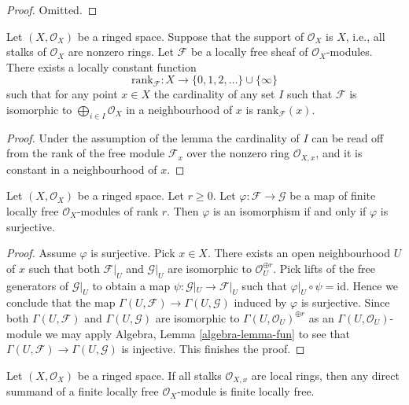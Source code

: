 \begin{proof}
Omitted.
\end{proof}

\begin{lemma}
\label{lemma-rank}
Let $(X, \mathcal{O}_X)$ be a ringed space.
Suppose that the support of $\mathcal{O}_X$ is $X$,
i.e., all stalks of $\mathcal{O}_X$ are nonzero rings.
Let $\mathcal{F}$ be a locally free sheaf of $\mathcal{O}_X$-modules.
There exists a locally constant function
$$
\text{rank}_\mathcal{F} :
X \longrightarrow \{0, 1, 2, \ldots\}\cup\{\infty\}
$$
such that for any point $x \in X$ the cardinality of any
set $I$ such that $\mathcal{F}$ is isomorphic to
$\bigoplus_{i\in I} \mathcal{O}_X$ in a neighbourhood
of $x$ is $\text{rank}_\mathcal{F}(x)$.
\end{lemma}

\begin{proof}
Under the assumption of the lemma the cardinality of $I$ can be read off
from the rank of the free module $\mathcal{F}_x$ over the nonzero ring
$\mathcal{O}_{X, x}$, and it is constant in a neighbourhood of $x$.
\end{proof}

\begin{lemma}
\label{lemma-map-finite-locally-free}
Let $(X, \mathcal{O}_X)$ be a ringed space. Let $r \geq 0$.
Let $\varphi : \mathcal{F} \to \mathcal{G}$ be a map of finite
locally free $\mathcal{O}_X$-modules of rank $r$.
Then $\varphi$ is an isomorphism if and only if $\varphi$
is surjective.
\end{lemma}

\begin{proof}
Assume $\varphi$ is surjective. Pick $x \in X$.
There exists an open neighbourhood $U$ of $x$
such that both $\mathcal{F}|_U$ and $\mathcal{G}|_U$ are
isomorphic to $\mathcal{O}_U^{\oplus r}$.
Pick lifts of the free generators of $\mathcal{G}|_U$
to obtain a map $\psi : \mathcal{G}|_U \to \mathcal{F}|_U$
such that $\varphi|_U \circ \psi = \text{id}$.
Hence we conclude that the map
$\Gamma(U, \mathcal{F}) \to \Gamma(U, \mathcal{G})$
induced by $\varphi$ is surjective. Since both
$\Gamma(U, \mathcal{F})$ and $\Gamma(U, \mathcal{G})$
are isomorphic to $\Gamma(U, \mathcal{O}_U)^{\oplus r}$
as an $\Gamma(U, \mathcal{O}_U)$-module we may
apply Algebra, Lemma \ref{algebra-lemma-fun} to see that
$\Gamma(U, \mathcal{F}) \to \Gamma(U, \mathcal{G})$
is injective. This finishes the proof.
\end{proof}

\begin{lemma}
\label{lemma-direct-summand-of-locally-free-is-locally-free}
Let $(X, \mathcal{O}_X)$ be a ringed space. If all stalks $\mathcal{O}_{X, x}$
are local rings, then any direct summand of a finite locally free
$\mathcal{O}_X$-module is finite locally free.
\end{lemma}

